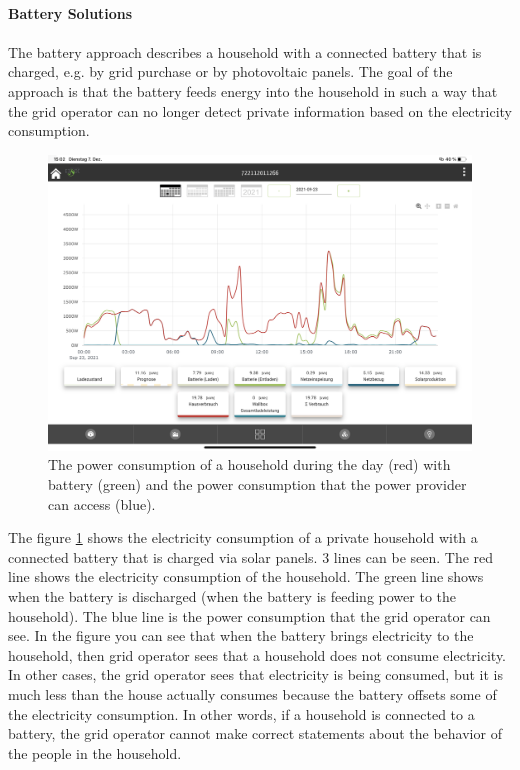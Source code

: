 \\
\textbf{Battery Solutions}
\\
\\
The battery approach describes a household with a connected battery that is charged, e.g. by grid purchase or by photovoltaic panels. The goal of the approach is that the battery feeds energy into the household in such a way that the grid operator can no longer detect private information based on the electricity consumption. \\
\begin{figure}[tbp]
  \centering
  \includegraphics[width=1\textwidth]{images/Battery.jpg}
  \caption[Battery Consumption Figure]{The power consumption of a household during the day (red) with battery (green) and the power consumption that the power provider can access (blue).}
  \label{fig:Battery}
\end{figure}
The figure \ref{fig:Battery} shows the electricity consumption of a private household with a connected battery that is charged via solar panels. 3 lines can be seen. The red line shows the electricity consumption of the household. The green line shows when the battery is discharged (when the battery is feeding power to the household). The blue line is the power consumption that the grid operator can see. In the figure you can see that when the battery brings electricity to the household, then grid operator sees that a household does not consume electricity. In other cases, the grid operator sees that electricity is being consumed, but it is much less than the house actually consumes because the battery offsets some of the electricity consumption. In other words, if a household is connected to a battery, the grid operator cannot make correct statements about the behavior of the people in the household. \\
